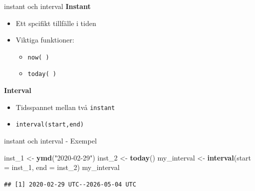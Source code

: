 \documentclass[
  11pt,
  ignorenonframetext,
  handout]{beamer}
\newenvironment{Shaded}{\begin{snugshade}}{\end{snugshade}}
\newcommand{\AttributeTok}[1]{\textcolor[rgb]{0.13,0.29,0.53}{#1}}
\newcommand{\FunctionTok}[1]{\textcolor[rgb]{0.13,0.29,0.53}{\textbf{#1}}}
\newcommand{\NormalTok}[1]{#1}
\newcommand{\OtherTok}[1]{\textcolor[rgb]{0.56,0.35,0.01}{#1}}
\newcommand{\StringTok}[1]{\textcolor[rgb]{0.31,0.60,0.02}{#1}}
\providecommand{\tightlist}{%
  \setlength{\itemsep}{0pt}\setlength{\parskip}{0pt}}
\begin{document}
\begin{frame}{instant och interval}
\protect{}\label{instant-och-interval}
\textbf{Instant}

\begin{itemize}
\tightlist
\item
  Ett spcifikt tillfälle i tiden
\item
  Viktiga funktioner:

  \begin{itemize}
  \tightlist
  \item
    \texttt{now( )}
  \item
    \texttt{today( )}
  \end{itemize}
\end{itemize}

\textbf{Interval}

\begin{itemize}
\tightlist
\item
  Tidsspannet mellan två \texttt{instant}
\item
  \texttt{interval(start,end)}
\end{itemize}
\end{frame}

\begin{frame}[fragile]{instant och interval - Exempel}
\protect{}\label{instant-och-interval---exempel}
\begin{Shaded}
\begin{Highlighting}[]
\NormalTok{inst\_1 }\OtherTok{\textless{}{-}} \FunctionTok{ymd}\NormalTok{(}\StringTok{"2020{-}02{-}29"}\NormalTok{)}
\NormalTok{inst\_2 }\OtherTok{\textless{}{-}} \FunctionTok{today}\NormalTok{()}
\NormalTok{my\_interval }\OtherTok{\textless{}{-}} \FunctionTok{interval}\NormalTok{(}\AttributeTok{start =}\NormalTok{ inst\_1, }\AttributeTok{end =}\NormalTok{ inst\_2)}
\NormalTok{my\_interval}
\end{Highlighting}
\end{Shaded}

\begin{verbatim}
## [1] 2020-02-29 UTC--2026-05-04 UTC
\end{verbatim}
\end{frame}
\end{document}
